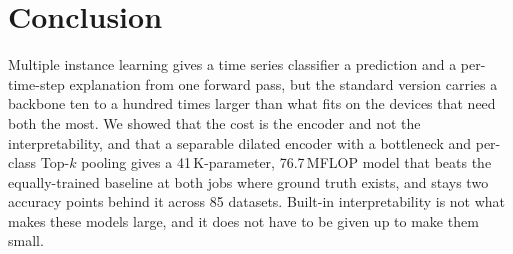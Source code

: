 
\section{Conclusion}
\label{sec:conclusion}

Multiple instance learning gives a time series classifier a prediction and a per-time-step
explanation from one forward pass, but the standard version carries a backbone ten to a hundred times
larger than what fits on the devices that need both the most. We showed that the cost is the encoder
and not the interpretability, and that a separable dilated encoder with a bottleneck and per-class
\mbox{Top-$k$} pooling gives a 41\,K-parameter, 76.7\,MFLOP model that beats the equally-trained
baseline at both jobs where ground truth exists, and stays two accuracy points behind it across 85
\ucr{} datasets. Built-in interpretability is not what makes these models large, and it does not have
to be given up to make them small.
